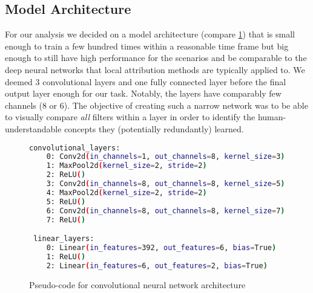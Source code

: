 \subsection{Model Architecture}
For our analysis we decided on a model architecture (compare \cref{fig:cnnmodel}) that is small enough to train a few hundred times within a reasonable time frame but big enough to still have high performance for the scenarios and be comparable to the deep neural networks that local attribution methods are typically applied to.
We deemed 3 convolutional layers and one fully connected layer before the final output layer enough for our task. Notably, the layers have comparably few channels (8 or 6). The objective of creating such a narrow network was to be able to visually compare \textit{all} filters within a layer in order to identify the human-understandable concepts they (potentially redundantly) learned. 

\begin{figure}[h!]
    \centering
\begin{lstlisting}[language=bash, label=lst:cnnmodel]
 convolutional_layers: 
    0: Conv2d(in_channels=1, out_channels=8, kernel_size=3)
    1: MaxPool2d(kernel_size=2, stride=2)
    2: ReLU()
    3: Conv2d(in_channels=8, out_channels=8, kernel_size=5)
    4: MaxPool2d(kernel_size=2, stride=2)
    5: ReLU()
    6: Conv2d(in_channels=8, out_channels=8, kernel_size=7)
    7: ReLU()

 linear_layers:
    0: Linear(in_features=392, out_features=6, bias=True)
    1: ReLU()
    2: Linear(in_features=6, out_features=2, bias=True)  

\end{lstlisting}
    \caption[Model Architecture]{Pseudo-code for convolutional neural network architecture}
    \label{fig:cnnmodel}
\end{figure}

